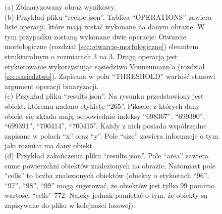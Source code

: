 \documentclass{article}
\begin{document}
\begin{figure}[H]
{                (a) Zbinaryzowany obraz wynikowy.\\
                (b) Przykład pliku ``recipe.json''. Tablica ``OPERATIONS'' zawiera liste operacji, które mają zostać wykonane na danym obrazie.
                    W tym przypadku zostaną wykonane dwie operacje: Otwarcie morfologiczne (rozdział \ref{sec:otwarcie-morfologiczne}) elemntem strukturalnym o rozmiarach 3 na 3.
                    Drugą operacją jest etykietowanie wykorzystując sąsiedztwo Vonneumann'a (rozdział \ref{sec:sasiedztwo}).
                    Zapisana w polu ``THRESHOLD'' wartość stanowi argument operacji binaryzacji.\\
                (c) Przykład pliku ``results.json''. Na rysunku przedstawiony jest obiekt, któremu nadano etykietę ``265''.
                    Piksele, z których dany obiekt się zkłada mają odpowiednio indeksy ``698367'', ``699390'', ``699391'', ``700414'', ``700415''.
                    Każdy z nich posiada współrzędne zapisane w polach ``x'' oraz ``y''.
                    Pole ``size'' zawiera informacje o tym jaki rozmiar ma dany obiekt.\\
                (d) Przykład zakończenia pliku ``results.json''. Pole ``area'' zawiera sume powierzchni obiektów znalezionych na obrazie,
                    Natomiast pole ``cells'' to liczba znalezionych obiektów 
                    (obiekty o etykietach ``96'', ``97'', ``98'', ``99'' mogą sugerować, że obiektów jest tylko 99 pomimo wartości ``cells'' 772. Należy jednak pamiętać o tym, że obiekty są zapisywane do pliku w kolejności losowej).
                \label{przykladowepliki}
            }
        \end{figure}
\end{document}
